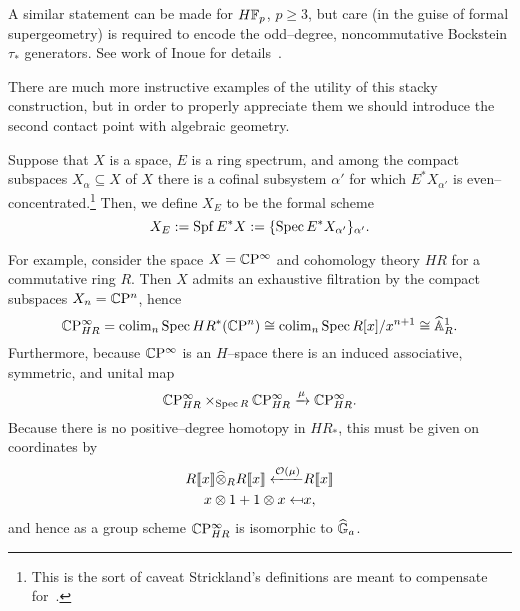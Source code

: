 \begin{remark}\label{InoueRemark}
A similar statement can be made for $H\mathbb F_p$, $p \ge 3$, but care (in the guise of formal supergeometry) is required to encode the odd--degree, noncommutative Bockstein $\tau_*$ generators.  See work of Inoue for details~\cite{Inoue}.
\end{remark}

There are much more instructive examples of the utility of this stacky construction, but in order to properly appreciate them we should introduce the second contact point with algebraic geometry.

\begin{definition}
Suppose that $X$ is a space, $E$ is a ring spectrum, and among the compact subspaces $X_\alpha \subseteq X$ of $X$ there is a cofinal subsystem $\alpha'$ for which $E^* X_{\alpha'}$ is even--concentrated.\footnote{This is the sort of caveat Strickland's definitions are meant to compensate for~\cite[Definition 8.15]{StricklandFSFG}.}  Then, we define $X_E$ to be the formal scheme \[X_E := \operatorname{Spf} E^* X := \{\operatorname{Spec} E^* X_{\alpha'}\}_{\alpha'}.\]
\end{definition}

\begin{example}
For example, consider the space $X = \mathbb{C}\mathrm P^\infty$ and cohomology theory $HR$ for a commutative ring $R$.  Then $X$ admits an exhaustive filtration by the compact subspaces $X_n = \mathbb{C}\mathrm P^n$, hence \[\mathbb{C}\mathrm P^\infty_{HR} = \operatorname{colim}_n \operatorname{Spec} HR^*(\mathbb{C}\mathrm P^n) \cong \operatorname{colim}_n \operatorname{Spec} R[x] / x^{n+1} \cong \widehat{\mathbb{A}}^1_R.\]  Furthermore, because $\mathbb{C}\mathrm P^\infty$ is an $H$--space there is an induced associative, symmetric, and unital map \[\mathbb{C}\mathrm P^\infty_{HR} \times_{\operatorname{Spec} R} \mathbb{C}\mathrm P^\infty_{HR} \xrightarrow{\mu} \mathbb{C}\mathrm P^\infty_{HR}.\]  Because there is no positive--degree homotopy in $HR_*$, this must be given on coordinates by
\begin{align*}
R\llbracket x \rrbracket \widehat\otimes_R R\llbracket x \rrbracket \xleftarrow{\mathcal{O}(\mu)} & R\llbracket x \rrbracket \\
x \otimes 1 + 1 \otimes x \mapsfrom & x,
\end{align*}
and hence as a group scheme $\mathbb{C}\mathrm P^\infty_{HR}$ is isomorphic to $\widehat{\mathbb G}_a$.
\end{example}

